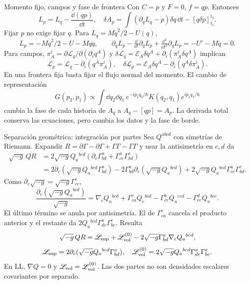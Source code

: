 \begin{frame}[label=holo-ll-02]{Momento fijo, campos y fase de frontera}
\footnotesize\CompactDisplaySpacing
Con $C=p$ y $F=0$, $f=qp$. Entonces
\begin{equation}
L_p=L_q-\frac{\dd(qp)}{\dd t},\quad
\delta A_p=\int(\partial_qL_q-\dot p)\delta q\,\dd t-[q\delta p]_{t_1}^{t_2}.
\label{eq:holo-dqp}
\end{equation}
Fijar $p$ no exige fijar $q$. Para $L_q=M\dot q^2/2-U(q)$,
\[
L_p=-M\dot q^2/2-U-Mq\ddot q,\qquad
\partial_qL_p-\tfrac{\dd}{\dd t}\partial_{\dot q}L_p
+\tfrac{\dd^2}{\dd t^2}\partial_{\ddot q}L_p=-U'-M\ddot q=0.
\]
Para campos, $\pi_A^i=\partial\mathscr L_q/\partial(\partial_iq^A)$ y
$\delta\mathscr L_q=\mathcal E_A\delta q^A+\partial_i(\pi_A^i\delta q^A)$ implican
\begin{equation}
\mathscr L_p=\mathscr L_q-\partial_i(q^A\pi_A^i),\quad
\delta\mathscr L_p=\mathcal E_A\delta q^A-\partial_i(q^A\delta\pi_A^i).
\label{eq:holo-fields}
\end{equation}
En una frontera fija basta fijar el flujo normal del momento. El cambio de representación
\[
G(p_2,p_1)\propto\int\dd q_2\dd q_1\,
e^{-ip_2q_2/\hbar}K(q_2,q_1)e^{ip_1q_1/\hbar}
\]
cambia la fase de cada historia de $A_q$ a $A_q-[qp]=A_p$.
La derivada total conserva las ecuaciones, pero cambia los datos y la fase de borde.
\end{frame}
\begin{frame}[label=holo-ll-03]{Separación geométrica: integración por partes}
\footnotesize\CompactDisplaySpacing
Sea $Q^{abcd}$ con simetrías de Riemann. Expandir $R=\partial\Gamma-\partial\Gamma+\Gamma\Gamma-\Gamma\Gamma$ y usar la antisimetría en $c,d$ da
\begin{align*}
\sqrt{-g}\,QR
&=2\sqrt{-g}Q_a{}^{bcd}(\partial_c\Gamma^a_{bd}+\Gamma^a_{ce}\Gamma^e_{bd})\\
&=2\partial_c(\sqrt{-g}Q_a{}^{bcd}\Gamma^a_{bd})
-2\Gamma^a_{bd}\partial_c(\sqrt{-g}Q_a{}^{bcd})
+2\sqrt{-g}Q_a{}^{bcd}\Gamma^a_{ce}\Gamma^e_{bd}.
\end{align*}
Como $\partial_c\sqrt{-g}=\sqrt{-g}\Gamma^e_{ec}$,
\[
\frac{\partial_c(\sqrt{-g}Q_a{}^{bcd})}{\sqrt{-g}}
=\nabla_cQ_a{}^{bcd}+\Gamma^e_{ca}Q_e{}^{bcd}
-\Gamma^b_{ce}Q_a{}^{ecd}-\Gamma^d_{ce}Q_a{}^{bce}.
\]
El último término se anula por antisimetría. El de $\Gamma^e_{ca}$ cancela el producto anterior y el restante da $2Q_a{}^{bcd}\Gamma^a_{de}\Gamma^e_{bc}$. Resulta
\begin{equation}
\sqrt{-g}\,QR=\mathscr L_{\rm sup}+\mathscr L_{\rm vol}^{(0)}
-2\sqrt{-g}\Gamma^a_{bd}\nabla_cQ_a{}^{bcd},
\label{eq:holo-split-general}
\end{equation}
\[
\mathscr L_{\rm sup}=2\partial_c(\sqrt{-g}Q_a{}^{bcd}\Gamma^a_{bd}),\quad
\mathscr L_{\rm vol}^{(0)}=2\sqrt{-g}Q_a{}^{bcd}\Gamma^a_{de}\Gamma^e_{bc}.
\]
En LL, $\nabla Q=0$ y $\mathscr L_{\rm vol}=\mathscr L_{\rm vol}^{(0)}$.
Las dos partes no son densidades escalares covariantes por separado.
\end{frame}
